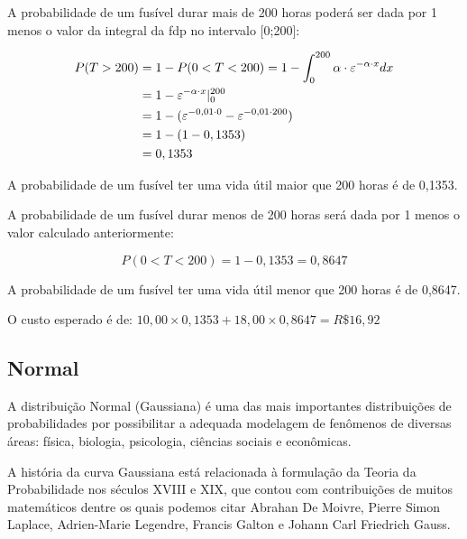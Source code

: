 \documentclass[
]{book}
\begin{document}
A probabilidade de um fusível durar mais de 200 horas poderá ser dada por 1 menos o valor da integral da fdp no intervalo {[}0;200{]}:

\hfill\break

\begin{align*}
P( T > 200) & = 1 - P(0<T<200) = 1- \int_{0}^{200}  \alpha \cdot \varepsilon ^{- \alpha \cdot x} dx \\
            & = 1 - \varepsilon^{-\alpha \cdot x} \rvert_{0}^{200} \\
            & = 1 - (\varepsilon^{- 0,01 \cdot 0} - \varepsilon^{-0,01 \cdot 200}) \\
            & = 1 - (1  - 0,1353) \\
            & = 0,1353 \newline
\end{align*}

\hfill\break

A probabilidade de um fusível ter uma vida útil maior que 200 horas é de 0,1353.

\hfill\break

A probabilidade de um fusível durar menos de 200 horas será dada por 1 menos o valor calculado anteriormente:

\hfill\break

\[
P( 0 < T < 200) = 1 - 0,1353 = 0,8647
\]

A probabilidade de um fusível ter uma vida útil menor que 200 horas é de 0,8647.

\hfill\break

O custo esperado é de: \(10,00 \times 0,1353 + 18,00 \times 0,8647 = R\$ 16,92\)

\hypertarget{normal}{%
\subsection{Normal}\label{normal}}

A distribuição Normal (Gaussiana) é uma das mais importantes distribuições de probabilidades por possibilitar a adequada modelagem de fenômenos de diversas áreas: física, biologia, psicologia, ciências sociais e econômicas.

\hfill\break

A história da curva Gaussiana está relacionada à formulação da Teoria da Probabilidade nos séculos XVIII e XIX, que contou com contribuições de muitos matemáticos dentre os quais podemos citar Abrahan De Moivre, Pierre Simon Laplace, Adrien-Marie Legendre, Francis Galton e Johann Carl Friedrich Gauss.
\end{document}
